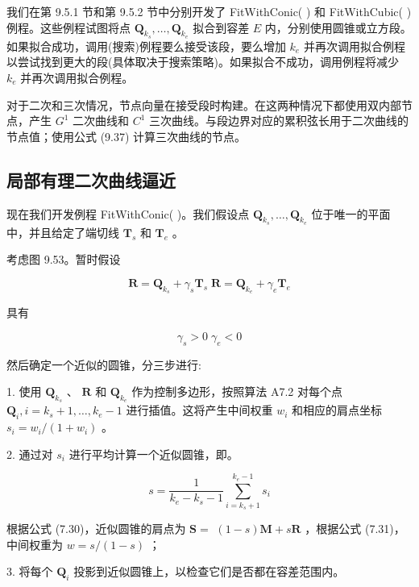 \documentclass[../main.tex]{subfiles}
\begin{document}
我们在第 9.5.1 节和第 9.5.2 节中分别开发了 FitWithConic(   ) 和 FitWithCubic(   ) 例程。这些例程试图将点 \({\mathbf{Q}}_{{k}_{s}},\ldots ,{\mathbf{Q}}_{{k}_{e}}\) 拟合到容差 \(E\) 内，分别使用圆锥或立方段。如果拟合成功，调用(搜索)例程要么接受该段，要么增加 \({k}_{e}\) 并再次调用拟合例程以尝试找到更大的段(具体取决于搜索策略)。如果拟合不成功，调用例程将减少 \({k}_{e}\) 并再次调用拟合例程。

对于二次和三次情况，节点向量在接受段时构建。在这两种情况下都使用双内部节点，产生 \({G}^{1}\) 二次曲线和 \({C}^{1}\) 三次曲线。与段边界对应的累积弦长用于二次曲线的节点值；使用公式 (9.37) 计算三次曲线的节点。



\subsection{局部有理二次曲线逼近}

现在我们开发例程 FitWithConic(   )。我们假设点 \({\mathbf{Q}}_{{k}_{s}},\ldots ,{\mathbf{Q}}_{{k}_{e}}\) 位于唯一的平面中，并且给定了端切线 \({\mathbf{T}}_{s}\) 和 \({\mathbf{T}}_{e}\) 。

考虑图 9.53。暂时假设

\[
\mathbf{R} = {\mathbf{Q}}_{{k}_{s}} + {\gamma }_{s}{\mathbf{T}}_{s}\;\mathbf{R} = {\mathbf{Q}}_{{k}_{e}} + {\gamma }_{e}{\mathbf{T}}_{e} \tag{9.90}
\]

具有

\[
{\gamma }_{s} > 0\;{\gamma }_{e} < 0 \tag{9.91}
\]

然后确定一个近似的圆锥，分三步进行:



1. 使用 \({\mathbf{Q}}_{{k}_{s}}\) 、 \(\mathbf{R}\) 和 \({\mathbf{Q}}_{{k}_{e}}\) 作为控制多边形，按照算法 A7.2 对每个点 \({\mathbf{Q}}_{i},i = {k}_{s} + 1,\ldots ,{k}_{e} - 1\) 进行插值。这将产生中间权重 \({w}_{i}\) 和相应的肩点坐标 \({s}_{i} = {w}_{i}/\left( {1 + {w}_{i}}\right)\) 。

2. 通过对 \({s}_{i}\) 进行平均计算一个近似圆锥，即。

\[
s = \frac{1}{{k}_{e} - {k}_{s} - 1}\mathop{\sum }\limits_{{i = {k}_{s} + 1}}^{{{k}_{e} - 1}}{s}_{i} \tag{9.92}
\]

根据公式 (7.30)，近似圆锥的肩点为 \(\mathbf{S} =\)  \(\left( {1 - s}\right) \mathbf{M} + s\mathbf{R}\) ，根据公式 (7.31)，中间权重为 \(w = s/\left( {1 - s}\right)\) ；

3. 将每个 \({\mathbf{Q}}_{i}\) 投影到近似圆锥上，以检查它们是否都在容差范围内。
\end{document}
